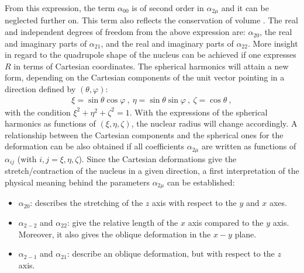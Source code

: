 From this expression, the term $\alpha_{00}$ is of second order in $\alpha_{2\mu}$ and it can be neglected further on. This term also reflects the conservation of volume \cite{greiner1996nuclear,ring2004nuclear}. The real and independent degrees of freedom from the above expression are: $\alpha_{20}$, the real and imaginary parts of $\alpha_{21}$, and the real and imaginary parts of $\alpha_{22}$. More insight in regard to the quadrupole shape of the nucleus can be achieved if one expresses $R$ in terms of Cartesian coordinates. The spherical harmonics will attain a new form, depending on the Cartesian components of the unit vector pointing in a direction defined by $(\theta,\varphi)$:
\begin{align}
    \xi=\sin\theta\cos\varphi\ ,\ \eta=\sin\theta\sin\varphi\ ,\ \zeta=\cos\theta\ ,
\end{align}
with the condition $\xi^2+\eta^2+\zeta^2=1$. With the expressions of the spherical harmonics as functions of $(\xi,\eta,\zeta)$, the nuclear radius will change accordingly. A relationship between the Cartesian components and the spherical ones for the deformation can be also obtained if all coefficients $\alpha_{2\mu}$ are written as functions of $\alpha_{ij}$ (with $i,j=\xi,\eta,\zeta$). Since the Cartesian deformations give the stretch/contraction of the nucleus in a given direction, a first interpretation of the physical meaning behind the parameters $\alpha_{2\mu}$ can be established:
\begin{itemize}
    \item $\alpha_{20}$: describes the stretching of the $z$ axis with respect to the $y$ and $x$ axes.
    \item $\alpha_{2-2}$ and $\alpha_{22}$: give the relative length of the $x$ axis compared to the $y$ axis. Moreover, it also gives the oblique deformation in the $x-y$ plane.
    \item $\alpha_{2-1}$ and $\alpha_{21}$: describe an oblique deformation, but with respect to the $z$ axis.
\end{itemize}

